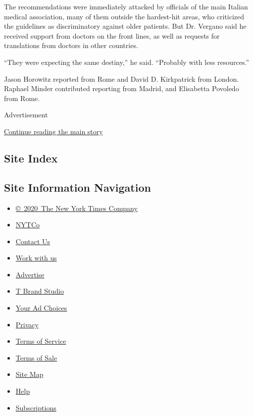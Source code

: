The recommendations were immediately attacked by officials of the main
Italian medical association, many of them outside the hardest-hit areas,
who criticized the guidelines as discriminatory against older patients.
But Dr. Vergano said he received support from doctors on the front
lines, as well as requests for translations from doctors in other
countries.

``They were expecting the same destiny,'' he said. ``Probably with less
resources.''

Jason Horowitz reported from Rome and David D. Kirkpatrick from London.
Raphael Minder contributed reporting from Madrid, and Elisabetta
Povoledo from Rome.

Advertisement

\protect\hyperlink{after-bottom}{Continue reading the main story}

\hypertarget{site-index}{%
\subsection{Site Index}\label{site-index}}

\hypertarget{site-information-navigation}{%
\subsection{Site Information
Navigation}\label{site-information-navigation}}

\begin{itemize}
\tightlist
\item
  \href{https://help.nytimes3xbfgragh.onion/hc/en-us/articles/115014792127-Copyright-notice}{©~2020~The
  New York Times Company}
\end{itemize}

\begin{itemize}
\tightlist
\item
  \href{https://www.nytco.com/}{NYTCo}
\item
  \href{https://help.nytimes3xbfgragh.onion/hc/en-us/articles/115015385887-Contact-Us}{Contact
  Us}
\item
  \href{https://www.nytco.com/careers/}{Work with us}
\item
  \href{https://nytmediakit.com/}{Advertise}
\item
  \href{http://www.tbrandstudio.com/}{T Brand Studio}
\item
  \href{https://www.nytimes3xbfgragh.onion/privacy/cookie-policy\#how-do-i-manage-trackers}{Your
  Ad Choices}
\item
  \href{https://www.nytimes3xbfgragh.onion/privacy}{Privacy}
\item
  \href{https://help.nytimes3xbfgragh.onion/hc/en-us/articles/115014893428-Terms-of-service}{Terms
  of Service}
\item
  \href{https://help.nytimes3xbfgragh.onion/hc/en-us/articles/115014893968-Terms-of-sale}{Terms
  of Sale}
\item
  \href{https://spiderbites.nytimes3xbfgragh.onion}{Site Map}
\item
  \href{https://help.nytimes3xbfgragh.onion/hc/en-us}{Help}
\item
  \href{https://www.nytimes3xbfgragh.onion/subscription?campaignId=37WXW}{Subscriptions}
\end{itemize}
